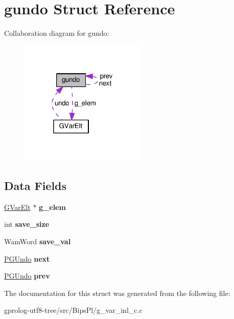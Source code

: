 \hypertarget{structgundo}{}\section{gundo Struct Reference}
\label{structgundo}


Collaboration diagram for gundo\+:\nopagebreak
\begin{figure}[H]
\begin{center}
\leavevmode
\includegraphics[width=170pt]{structgundo__coll__graph}
\end{center}
\end{figure}
\subsection*{Data Fields}
\begin{DoxyCompactItemize}
\item 
\hyperlink{structGVarElt}{G\+Var\+Elt} $\ast$ {\bfseries g\+\_\+elem}\hypertarget{structgundo_a215f96c167e2bc2aa0902fd04fcce89b}{}\label{structgundo_a215f96c167e2bc2aa0902fd04fcce89b}

\item 
int {\bfseries save\+\_\+size}\hypertarget{structgundo_a543c16d629efbb1e5e1260ef2f9438b5}{}\label{structgundo_a543c16d629efbb1e5e1260ef2f9438b5}

\item 
Wam\+Word {\bfseries save\+\_\+val}\hypertarget{structgundo_ad9b4b183b039fa879a47f9b4a400c742}{}\label{structgundo_ad9b4b183b039fa879a47f9b4a400c742}

\item 
\hyperlink{structgundo}{P\+G\+Undo} {\bfseries next}\hypertarget{structgundo_aa4dd84818a7b36f26b0f7524e850fec9}{}\label{structgundo_aa4dd84818a7b36f26b0f7524e850fec9}

\item 
\hyperlink{structgundo}{P\+G\+Undo} {\bfseries prev}\hypertarget{structgundo_aeb28eb449ba2732d088663c85b986d75}{}\label{structgundo_aeb28eb449ba2732d088663c85b986d75}

\end{DoxyCompactItemize}


The documentation for this struct was generated from the following file\+:\begin{DoxyCompactItemize}
\item 
gprolog-\/utf8-\/tree/src/\+Bips\+Pl/g\+\_\+var\+\_\+inl\+\_\+c.\+c\end{DoxyCompactItemize}
